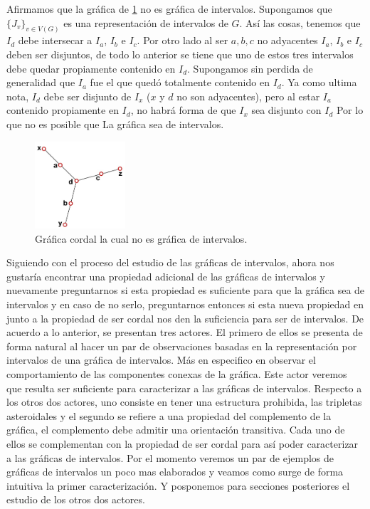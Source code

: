 Afirmamos que la gráfica de \cref{fig:GrafCrdlnodeInt} no es gráfica de
intervalos. Supongamos que $ \{ J_v \}_{v\in V(G)}$ es una representación de
intervalos de $G$. Así las cosas, tenemos que $I_d$ debe intersecar a $I_a$,
$I_b$ e $I_c$. Por otro lado al ser $a,b,c$ no adyacentes $I_a$, $I_b$ e $I_c$
deben ser disjuntos, de todo lo anterior se tiene que uno de estos tres
intervalos debe quedar propiamente contenido en $I_d$. Supongamos sin perdida de
generalidad que $I_a$ fue el que quedó totalmente contenido en $I_d$. Ya como
ultima nota, $I_d$ debe ser disjunto de $I_x$  ($x$ y $d$ no son adyacentes),
pero al estar $I_a$ contenido propiamente en $I_d$, no habrá forma de que $I_x$
sea disjunto con $I_d$ Por lo que no es posible que La gráfica sea de
intervalos.

\begin{figure}[H]
  \centering
  \includegraphics[width=0.3\textwidth]{recursos/capturas/204.jpg}
  \caption{Gráfica cordal la cual no es gráfica de intervalos.}
  \label{fig:GrafCrdlnodeInt}
\end{figure}

Siguiendo con el proceso del estudio de las gráficas de intervalos, ahora nos
gustaría encontrar una propiedad adicional de las gráficas de intervalos y
nuevamente preguntarnos si esta propiedad es suficiente para que la gráfica sea
de intervalos y en caso de no serlo, preguntarnos entonces si esta nueva
propiedad en junto a la propiedad de ser cordal nos den la suficiencia para ser
de intervalos. De acuerdo a lo anterior, se presentan tres actores. El primero
de ellos se presenta de forma natural al hacer un par de observaciones basadas
en la representación por intervalos de una gráfica de intervalos. Más en
especifico en observar el comportamiento de las componentes conexas de la
gráfica. Este actor veremos que resulta ser suficiente para caracterizar a las
gráficas de intervalos. Respecto a los otros dos actores, uno consiste en tener
una estructura prohibida, las tripletas asteroidales y el segundo se refiere a
una propiedad del complemento de la gráfica, el complemento debe admitir una
orientación transitiva. Cada uno de ellos se complementan con la propiedad de
ser cordal para así poder caracterizar a las gráficas de intervalos. Por el
momento veremos un par de ejemplos de gráficas de intervalos un poco mas
elaborados y veamos como surge de forma intuitiva la primer caracterización. Y
posponemos para secciones posteriores el estudio de los otros dos actores.

